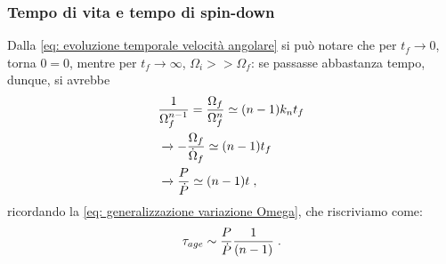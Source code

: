\subsubsection{Tempo di vita e tempo di spin-down}
Dalla \eqref{eq: evoluzione temporale velocità angolare} si può notare che per $t_f\xrightarrow{}0$, torna $0=0$, mentre per $t_f\xrightarrow{}\infty$, $\Omega_i>>\Omega_f$:
se passasse abbastanza tempo, dunque, si avrebbe
\begin{align}
    &\frac{1}{\Omega_f^{n-1}} = \frac{\Omega_f}{\Omega_f^n}\simeq(n-1)k_nt_f\\
    &\xrightarrow{} -\frac{\Omega_f}{\dot{\Omega}_f} \simeq (n-1)t_f\\
    &\xrightarrow{} \frac{P}{\dot{P}} \simeq (n-1)t \hspace{1mm}, 
\end{align}
ricordando la \eqref{eq: generalizzazione variazione Omega}, che riscriviamo come:
\begin{equation}
    \tau_{age}\sim \frac{P}{\dot{P}}\frac{1}{(n-1)}\hspace{1mm}.
    \label{eq: tempo di vita ns}
\end{equation}

